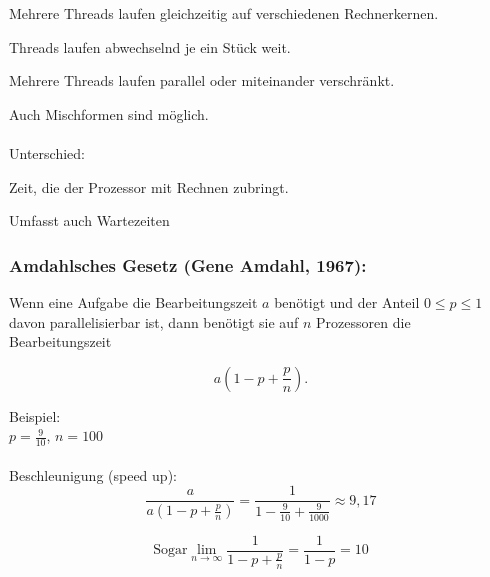 \begin{definition}[parallel]
Mehrere Threads laufen gleichzeitig auf verschiedenen Rechnerkernen.
\end{definition}

\begin{definition}
Threads laufen abwechselnd je ein Stück weit.
\end{definition}

\begin{definition}
Mehrere Threads laufen parallel oder miteinander verschränkt.
\end{definition}

Auch Mischformen sind möglich.\\
\\
Unterschied:\\
\begin{definition}
Zeit, die der Prozessor mit Rechnen zubringt.
\end{definition}

\begin{definition}
Umfasst auch Wartezeiten
\end{definition}

\subsubsection*{Amdahlsches Gesetz (Gene Amdahl, 1967):}
Wenn eine Aufgabe die Bearbeitungszeit $ a $ benötigt und der Anteil $ 0 \leq p \leq 1 $ davon parallelisierbar ist, dann benötigt sie auf $ n $ Prozessoren die Bearbeitungszeit

\begin{equation}
a \left( 1 - p + \frac{p}{n} \right).
\end{equation}

Beispiel:\\
$ p = \frac{9}{10} $, $ n = 100 $\\
\\
Beschleunigung (speed up):
\begin{equation*}
 \frac{a}{a \left( 1 - p + \frac{p}{n} \right)} = \frac{1}{1 - \frac{9}{10} + \frac{9}{1000}} \approx 9,17
\end{equation*}

\begin{equation*}
\text{Sogar} \lim\limits_{n \to \infty} \frac{1}{1 - p + \frac{p}{n}} = \frac{1}{1 - p} = 10
\end{equation*}

